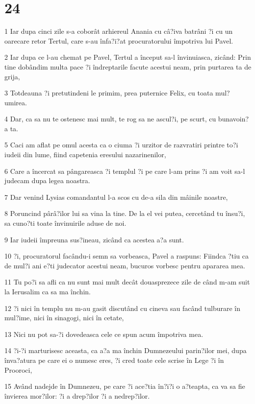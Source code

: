 \chapter{24}

\par 1 Iar dupa cinci zile s-a coborât arhiereul Anania cu câ?iva batrâni ?i cu un oarecare retor Tertul, care s-au înfa?i?at procuratorului împotriva lui Pavel.
\par 2 Iar dupa ce l-au chemat pe Pavel, Tertul a început sa-l învinuiasca, zicând: Prin tine dobândim multa pace ?i îndreptarile facute acestui neam, prin purtarea ta de grija,
\par 3 Totdeauna ?i pretutindeni le primim, prea puternice Felix, cu toata mul?umirea.
\par 4 Dar, ca sa nu te ostenesc mai mult, te rog sa ne ascul?i, pe scurt, cu bunavoin?a ta.
\par 5 Caci am aflat pe omul acesta ca o ciuma ?i urzitor de razvratiri printre to?i iudeii din lume, fiind capetenia eresului nazarinenilor,
\par 6 Care a încercat sa pângareasca ?i templul ?i pe care l-am prins ?i am voit sa-l judecam dupa legea noastra.
\par 7 Dar venind Lysias comandantul l-a scos cu de-a sila din mâinile noastre,
\par 8 Poruncind pârâ?ilor lui sa vina la tine. De la el vei putea, cercetând tu însu?i, sa cuno?ti toate învinuirile aduse de noi.
\par 9 Iar iudeii împreuna sus?ineau, zicând ca acestea a?a sunt.
\par 10 ?i, procuratorul facându-i semn sa vorbeasca, Pavel a raspuns: Fiindca ?tiu ca de mul?i ani e?ti judecator acestui neam, bucuros vorbesc pentru apararea mea.
\par 11 Tu po?i sa afli ca nu sunt mai mult decât douasprezece zile de când m-am suit la Ierusalim ca sa ma închin.
\par 12 ?i nici în templu nu m-au gasit discutând cu cineva sau facând tulburare în mul?ime, nici în sinagogi, nici în cetate,
\par 13 Nici nu pot sa-?i dovedeasca cele ce spun acum împotriva mea.
\par 14 ?i-?i marturisesc aceasta, ca a?a ma închin Dumnezeului parin?ilor mei, dupa înva?atura pe care ei o numesc eres, ?i cred toate cele scrise în Lege ?i în Prooroci,
\par 15 Având nadejde în Dumnezeu, pe care ?i ace?tia în?i?i o a?teapta, ca va sa fie învierea mor?ilor: ?i a drep?ilor ?i a nedrep?ilor.
